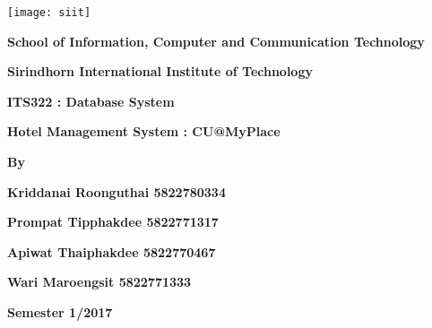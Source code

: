 \begin{titlepage}
    \begin{center}
    \large
    	\begin{center}
	\texttt{[image: siit]}
	\end{center}
	\vspace{0.5cm}
        \textbf{School of Information, Computer and Communication Technology} \par
        \vspace{0.5cm}

        \textbf{Sirindhorn International Institute of Technology}

        \vspace{3cm}

        \vspace{0.5cm}

        \textbf{ITS322 : Database System}
        \vspace{0.5cm}

        \textbf{Hotel Management System : CU@MyPlace}

        \vspace{2cm}
        \textbf{By}
        \vspace{0.5cm}

        \textbf{Kriddanai Roonguthai 5822780334}
        \vspace{0.25cm}

        \textbf{Prompat Tipphakdee 5822771317}
        \vspace{0.25cm}

        \textbf{Apiwat Thaiphakdee 5822770467}
        \vspace{0.25cm}

        \textbf{Wari Maroengsit 5822771333}
        \vspace{0.25cm}

        \vspace{3cm}
        \textbf{Semester 1/2017}
    \end{center}
\end{titlepage}
